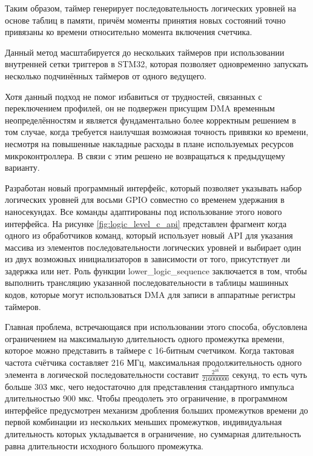 \documentclass{report}
\begin{document}
Таким образом, таймер генерирует последовательность логических уровней на основе таблиц в памяти, причём моменты принятия новых состояний точно привязаны ко времени относительно момента включения счетчика.

Данный метод масштабируется до нескольких таймеров при использовании внутренней сетки триггеров в STM32, которая позволяет одновременно запускать несколько подчинённых таймеров от одного ведущего.

Хотя данный подход не помог избавиться от трудностей, связанных с переключением профилей, он не подвержен присущим DMA временным неопределённостям и является фундаментально более корректным решением в том случае, когда требуется наилучшая возможная точность привязки ко времени, несмотря на повышенные накладные расходы в плане используемых ресурсов микроконтроллера. В связи с этим решено не возвращаться к предыдущему варианту.

Разработан новый программный интерфейс, который позволяет указывать набор логических уровней для восьми GPIO совместно со временем удержания в наносекундах. Все команды адаптированы под использование этого нового интерфейса. На рисунке \ref{fig:logic_level_c_api} представлен фрагмент когда одного из обработчиков команд, который использует новый API для указания массива из элементов последовательности логических уровней и выбирает один из двух возможных инициализаторов в зависимости от того, присутствует ли задержка или нет. Роль функции lower\_logic\_sequence заключается в том, чтобы выполнить трансляцию указанной последовательности в таблицы машинных кодов, которые могут использоваться DMA для записи в аппаратные регистры таймеров.


Главная проблема, встречающаяся при использовании этого способа, обусловлена ограничением на максимальную длительность одного промежутка времени, которое можно представить в таймере с 16-битным счетчиком. Когда тактовая частота счётчика составляет 216 МГц, максимальная продолжительность одного элемента в логической последовательности составит $\frac{2^{16}}{216000000}$ секунд, то есть чуть больше 303 мкс, чего недостаточно для представления стандартного импульса длительностью 900 мкс. Чтобы преодолеть это ограничение, в программном интерфейсе предусмотрен механизм дробления больших промежутков времени до первой комбинации из нескольких меньших промежутков, индивидуальная длительность которых укладывается в ограничение, но суммарная длительность равна длительности исходного большого промежутка.
\end{document}
